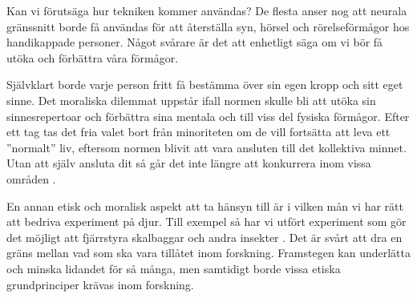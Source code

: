 \documentclass[12pt, a4paper]{article}
\begin{document}
Kan vi förutsäga hur tekniken kommer användas? De flesta anser nog att neurala
gränssnitt borde få användas för att återställa syn, hörsel och rörelseförmågor
hos handikappade personer. Något svårare är det att enhetligt säga om vi bör få
utöka och förbättra våra förmågor.

Självklart borde varje person fritt få bestämma över sin egen kropp och sitt
eget sinne. Det moraliska dilemmat uppstår ifall normen skulle bli att utöka sin
sinnesrepertoar och förbättra sina mentala och till viss del fysiska förmågor.
Efter ett tag tas det fria valet bort från minoriteten om de vill fortsätta att
leva ett ''normalt'' liv, eftersom normen blivit att vara ansluten till det
kollektiva minnet. Utan att själv ansluta dit så går det inte längre att
konkurrera inom vissa områden \cite{ethics_eu} \cite{ethics1}.

En annan etisk och moralisk aspekt att ta hänsyn till är i vilken mån vi har
rätt att bedriva experiment på djur. Till exempel så har vi utfört experiment
som gör det möjligt att fjärrstyra skalbaggar och andra insekter \cite{ethics2}.
Det är svårt att dra en gräns mellan vad som ska vara tillåtet inom forskning.
Framstegen kan underlätta och minska lidandet för så många, men samtidigt borde
vissa etiska grundprinciper krävas inom forskning.







%
%



\pagebreak


\end{document}
